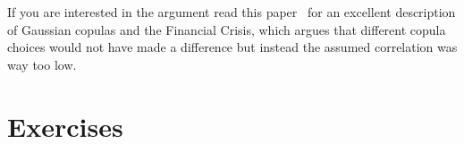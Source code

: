 If you are interested in the argument read this paper~\cite{bib:copula_and_2008} for an excellent description of Gaussian copulas and the Financial Crisis, which argues that different copula choices would not have made a difference but instead the assumed correlation was way too low.

\section*{Exercises}

